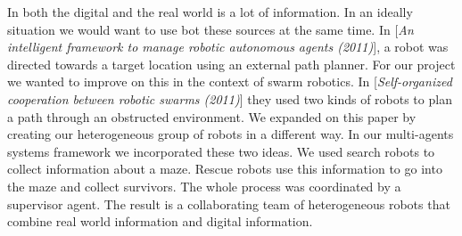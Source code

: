 In both the digital and the real world is a lot of information. In an ideally situation we would want to use bot these sources at the same time. In [\textit{An intelligent framework to manage robotic autonomous agents (2011)}], a robot was directed towards a target location using an external path planner. For our project we wanted to improve on this in the context of swarm robotics. In [\textit{Self-organized cooperation between robotic swarms (2011)}] they used two kinds of robots to plan a path through an obstructed environment.  We expanded on this paper by creating our heterogeneous group of robots in a different way.
In our multi-agents systems framework we incorporated these two ideas. We used search robots to collect information about a maze. Rescue robots use this information to go into the maze and collect survivors. The whole process was coordinated by a supervisor agent.
The result is a collaborating team of heterogeneous robots that combine real world information and digital information. 

